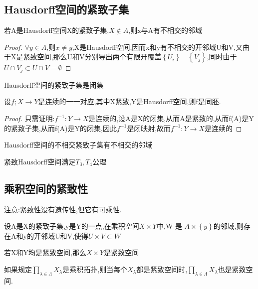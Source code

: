     \subsection*{Hausdorff空间的紧致子集}
    \begin{corollary}
        若A是Hausdorff空间X的紧致子集,\(X \notin A\),则x与A有不相交的邻域
    \end{corollary}
    \begin{proof}
        \(\forall y \in A \),则\(x \neq y\),X是Hausdorff空间,因而x和y有不相交的开邻域U和V,又由于X是紧致空间,那么U和V分别导出两个有限开覆盖\(\left\{U_i\right\} \quad \left\{V_j\right\}\),同时由于\(U \cap  V_j \subset U \cap V = \emptyset\)
    \end{proof}
    \begin{lemma}
        Hausdorff空间的紧致子集是闭集
    \end{lemma}
    \begin{theorem}
        设\(f; X \rightarrow Y \)是连续的一一对应,其中X紧致,Y是Hausdorff空间,则f是同胚.
    \end{theorem}
    \begin{proof}
        只需证明:\(f^{-1} : Y \rightarrow X\)是连续的,设A是X的闭集,从而A是紧致的,从而f(A)是Y的紧致子集,从而f(A)是Y的闭集,因此\(f^{-1}\)是闭映射,故而\(f^{-1} : Y \rightarrow X\)是连续的
    \end{proof}
    \begin{corollary}
        Hausdorff空间的不相交紧致子集有不相交的邻域
    \end{corollary}
    \begin{corollary}
        紧致Hausdorff空间满足\(T_3 , T_4\)公理
    \end{corollary}
    \subsection*{乘积空间的紧致性}
    注意:紧致性没有遗传性,但它有可乘性.
    \begin{lemma}
        设A是X的紧致子集,y是Y的一点,在乘积空间\(X \times Y \)中,W 是 \(A \times \left\{y\right\}\)的邻域,则存在A和y的开邻域U和V,使得\(U \times V \subset W \)
    \end{lemma}
    \begin{theorem}
        若X和Y均是紧致空间,那么\(X \times Y \)是紧致空间
    \end{theorem}
    \begin{theorem}[吉洪诺夫定理]
        如果规定\(\prod\limits_{\lambda\in \Lambda} X_{\lambda}\)是乘积拓扑,则当每个\(X_{\lambda}\)都是紧致空间时,\(\prod\limits_{\lambda\in \Lambda} X_{\lambda}\)也是紧致空间.
    \end{theorem}
